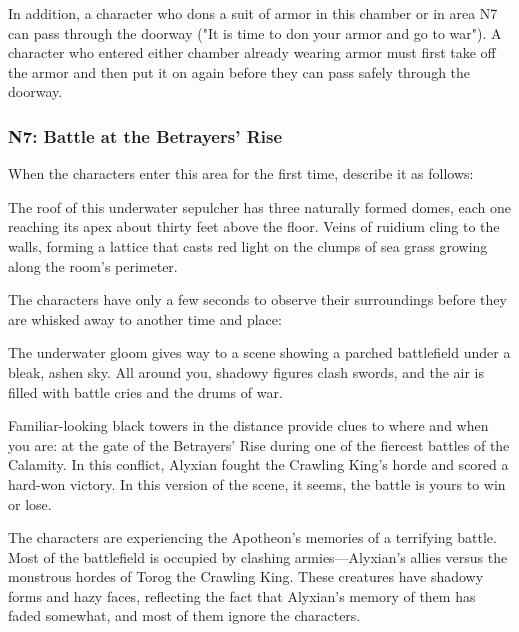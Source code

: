 \documentclass[10pt,a4paper,twoside,bg=print,twocolumn,openany,nodeprecatedcode]{dndbook}
\begin{document}
In addition, a character who dons a suit of armor in this chamber or in area N7 can pass through the doorway ("It is time to don your armor and go to war"). A character who entered either chamber already wearing armor must first take off the armor and then put it on again before they can pass safely through the doorway.

\subsubsection{N7: Battle at the Betrayers' Rise}
When the characters enter this area for the first time, describe it as follows:

\begin{DndReadAloud}{}
The roof of this underwater sepulcher has three naturally formed domes, each one reaching its apex about thirty feet above the floor. Veins of ruidium cling to the walls, forming a lattice that casts red light on the clumps of sea grass growing along the room's perimeter.

\end{DndReadAloud}

The characters have only a few seconds to observe their surroundings before they are whisked away to another time and place:

\begin{DndReadAloud}{}
The underwater gloom gives way to a scene showing a parched battlefield under a bleak, ashen sky. All around you, shadowy figures clash swords, and the air is filled with battle cries and the drums of war.

Familiar-looking black towers in the distance provide clues to where and when you are: at the gate of the Betrayers' Rise during one of the fiercest battles of the Calamity. In this conflict, Alyxian fought the Crawling King's horde and scored a hard-won victory. In this version of the scene, it seems, the battle is yours to win or lose.

\end{DndReadAloud}

The characters are experiencing the Apotheon's memories of a terrifying battle. Most of the battlefield is occupied by clashing armies—Alyxian's allies versus the monstrous hordes of Torog the Crawling King. These creatures have shadowy forms and hazy faces, reflecting the fact that Alyxian's memory of them has faded somewhat, and most of them ignore the characters.
\end{document}
